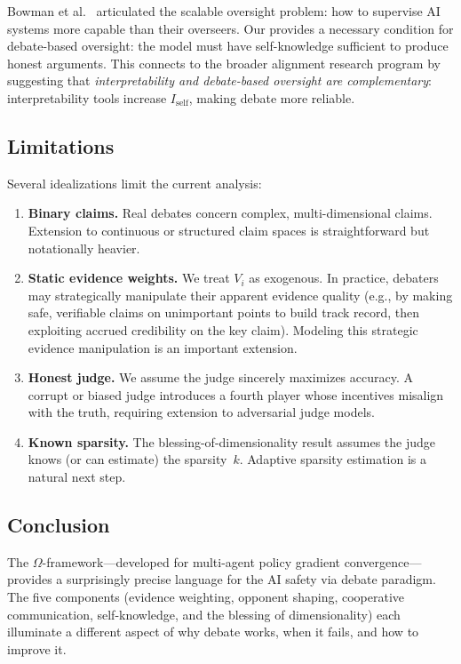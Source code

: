 \documentclass[11pt,a4paper]{article}
\begin{document}
Bowman et al.\ \cite{bowman2022} articulated the scalable oversight
problem: how to supervise AI systems more capable than their overseers.
Our  provides a necessary condition for
debate-based oversight: the model must have self-knowledge sufficient
to produce honest arguments. This connects to the broader alignment
research program by suggesting that \emph{interpretability and
debate-based oversight are complementary}: interpretability tools
increase $I_{\text{self}}$, making debate more reliable.

\subsection{Limitations}

Several idealizations limit the current analysis:

\begin{enumerate}
    \item \textbf{Binary claims.} Real debates concern complex,
    multi-dimensional claims. Extension to continuous or structured
    claim spaces is straightforward but notationally heavier.

    \item \textbf{Static evidence weights.} We treat $V_i$ as
    exogenous. In practice, debaters may strategically manipulate their
    apparent evidence quality (e.g., by making safe, verifiable claims
    on unimportant points to build track record, then exploiting
    accrued credibility on the key claim). Modeling this strategic
    evidence manipulation is an important extension.

    \item \textbf{Honest judge.} We assume the judge sincerely
    maximizes accuracy. A corrupt or biased judge introduces a fourth
    player whose incentives misalign with the truth, requiring
    extension to adversarial judge models.

    \item \textbf{Known sparsity.} The blessing-of-dimensionality
    result assumes the judge knows (or can estimate) the sparsity~$k$.
    Adaptive sparsity estimation is a natural next step.
\end{enumerate}

\subsection{Conclusion}

The $\Omega$-framework---developed for multi-agent policy gradient
convergence---provides a surprisingly precise language for the
AI safety via debate paradigm. The five components (evidence weighting,
opponent shaping, cooperative communication, self-knowledge, and
the blessing of dimensionality) each illuminate a different aspect
of why debate works, when it fails, and how to improve it.
\end{document}
